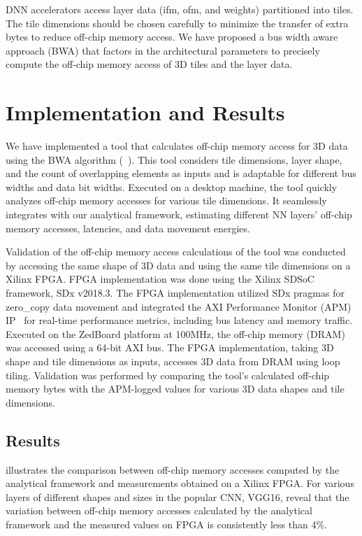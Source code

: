DNN accelerators access layer data (ifm, ofm, and weights) partitioned into tiles. The tile dimensions should be chosen carefully to minimize the transfer of extra bytes to reduce off-chip memory access. We have proposed a bus width aware approach (BWA) that factors in the architectural parameters to precisely compute the off-chip memory access of 3D tiles and the layer data.

\section{Implementation and Results}
We have implemented a tool that calculates off-chip memory access for 3D data using the BWA algorithm (~). This tool considers tile dimensions, layer shape, and the count of overlapping elements as inputs and is adaptable for different bus widths and data bit widths. Executed on a desktop machine, the tool quickly analyzes off-chip memory accesses for various tile dimensions. It seamlessly integrates with our analytical framework, estimating different NN layers' off-chip memory accesses, latencies, and data movement energies.

Validation of the off-chip memory access calculations of the tool was conducted by accessing the same shape of 3D data and using the same tile dimensions on a Xilinx FPGA. FPGA implementation was done using the Xilinx SDSoC framework, SDx v2018.3. The FPGA implementation utilized SDx pragmas for zero\_copy data movement and integrated the AXI Performance Monitor (APM) IP~\cite{APM} for real-time performance metrics, including bus latency and memory traffic. Executed on the ZedBoard platform at 100MHz, the off-chip memory (DRAM) was accessed using a 64-bit AXI bus. The FPGA implementation, taking 3D shape and tile dimensions as inputs, accesses 3D data from DRAM using loop tiling. Validation was performed by comparing the tool's calculated off-chip memory bytes with the APM-logged values for various 3D data shapes and tile dimensions.
\subsection{Results}
 illustrates the comparison between off-chip memory accesses computed by the analytical framework and measurements obtained on a Xilinx FPGA. For various layers of different shapes and sizes in the popular CNN, VGG16, reveal that the variation between off-chip memory accesses calculated by the analytical framework and the measured values on FPGA is consistently less than 4\%.  

